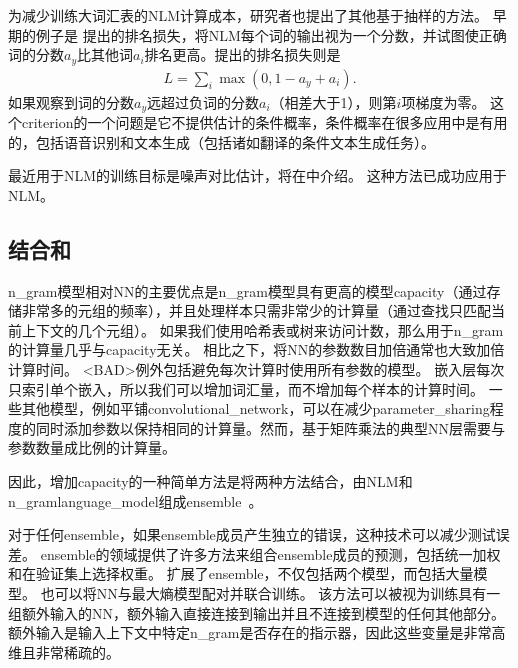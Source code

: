 \label{sec:combining_neural_language_models_with_n_grams}
为减少训练大词汇表的\gls{NLM}计算成本，研究者也提出了其他基于抽样的方法。
早期的例子是 \citet{Collobert+Weston-ICML2008}提出的排名损失，将\gls{NLM}每个词的输出视为一个分数，并试图使正确词的分数$a_y$比其他词$a_i$排名更高。提出的排名损失则是
\begin{align} 
 L = \sum_i \max(0,1-a_y+a_i).
\end{align} 
如果观察到词的分数$a_y$远超过负词的分数$a_i$（相差大于1），则第$i$项梯度为零。
这个\gls{criterion}的一个问题是它不提供估计的条件概率，条件概率在很多应用中是有用的，包括语音识别和文本生成（包括诸如翻译的条件文本生成任务）。

最近用于\gls{NLM}的训练目标是噪声对比估计，将在中介绍。
这种方法已成功应用于\gls{NLM}\citep{Mnih+Teh-ICML2012,Mnih2013}。


\subsection{结合和}
\gls{n_gram}模型相对\gls{NN}的主要优点是\gls{n_gram}模型具有更高的模型\gls{capacity}（通过存储非常多的元组的频率），并且处理样本只需非常少的计算量（通过查找只匹配当前上下文的几个元组）。
如果我们使用哈希表或树来访问计数，那么用于\gls{n_gram}的计算量几乎与\gls{capacity}无关。
相比之下，将\gls{NN}的参数数目加倍通常也大致加倍计算时间。
<BAD>例外包括避免每次计算时使用所有参数的模型。
嵌入层每次只索引单个嵌入，所以我们可以增加词汇量，而不增加每个样本的计算时间。
一些其他模型，例如平铺\gls{convolutional_network}，可以在减少\gls{parameter_sharing}程度的同时添加参数以保持相同的计算量。然而，基于矩阵乘法的典型\gls{NN}层需要与参数数量成比例的计算量。

因此，增加\gls{capacity}的一种简单方法是将两种方法结合，由\gls{NLM}和\gls{n_gram}\gls{language_model}组成\gls{ensemble}~\citep{BenDucVin01-small,Bengio-nnlm2003-small}。

对于任何\gls{ensemble}，如果\gls{ensemble}成员产生独立的错误，这种技术可以减少测试误差。
\gls{ensemble}的领域提供了许多方法来组合\gls{ensemble}成员的预测，包括统一加权和在验证集上选择权重。
\citet{Mikolov-Interspeech-2011} 扩展了\gls{ensemble}，不仅包括两个模型，而包括大量模型。
也可以将\gls{NN}与最大熵模型配对并联合训练\citep{Mikolov-ASRU-2011}。
该方法可以被视为训练具有一组额外输入的\gls{NN}，额外输入直接连接到输出并且不连接到模型的任何其他部分。
额外输入是输入上下文中特定\gls{n_gram}是否存在的指示器，因此这些变量是非常高维且非常稀疏的。

